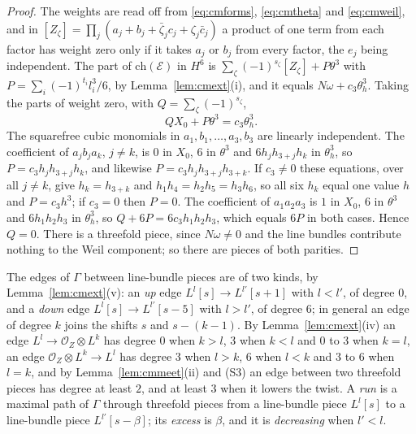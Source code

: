 \documentclass[11pt,reqno]{amsart}
\numberwithin{equation}{section}
\theoremstyle{plain}
\theoremstyle{definition}
\newcommand{\ch}{\mathrm{ch}}
\begin{document}
\begin{proof}
The weights are read off from \eqref{eq:cmforms}, \eqref{eq:cmtheta} and \eqref{eq:cmweil}, and in $[Z_{\zeta}]=\prod_{j}(a_{j}+b_{j}+\bar\zeta_{j}c_{j}+\zeta_{j}\bar c_{j})$ a product of one term from each factor has weight zero only if it takes $a_{j}$ or $b_{j}$ from every factor, the $e_{j}$ being independent. The part of $\ch(\mathcal{E})$ in $H^{6}$ is $\sum_{\zeta}(-1)^{s_{\zeta}}[Z_{\zeta}]+P\theta^{3}$ with $P=\sum_{i}(-1)^{t_{i}}l_{i}^{3}/6$, by Lemma~\ref{lem:cmext}(i), and it equals $N\omega+c_{3}\theta_{h}^{3}$. Taking the parts of weight zero, with $Q=\sum_{\zeta}(-1)^{s_{\zeta}}$,
\[
QX_{0}+P\theta^{3}=c_{3}\theta_{h}^{3}.
\]
The squarefree cubic monomials in $a_{1},b_{1},\dots,a_{3},b_{3}$ are linearly independent. The coefficient of $a_{j}b_{j}a_{k}$, $j\ne k$, is $0$ in $X_{0}$, $6$ in $\theta^{3}$ and $6h_{j}h_{3+j}h_{k}$ in $\theta_{h}^{3}$, so $P=c_{3}h_{j}h_{3+j}h_{k}$, and likewise $P=c_{3}h_{j}h_{3+j}h_{3+k}$. If $c_{3}\ne0$ these equations, over all $j\ne k$, give $h_{k}=h_{3+k}$ and $h_{1}h_{4}=h_{2}h_{5}=h_{3}h_{6}$, so all six $h_{k}$ equal one value $h$ and $P=c_{3}h^{3}$; if $c_{3}=0$ then $P=0$. The coefficient of $a_{1}a_{2}a_{3}$ is $1$ in $X_{0}$, $6$ in $\theta^{3}$ and $6h_{1}h_{2}h_{3}$ in $\theta_{h}^{3}$, so $Q+6P=6c_{3}h_{1}h_{2}h_{3}$, which equals $6P$ in both cases. Hence $Q=0$. There is a threefold piece, since $N\omega\ne0$ and the line bundles contribute nothing to the Weil component; so there are pieces of both parities.
\end{proof}

The edges of $\Gamma$ between line-bundle pieces are of two kinds, by Lemma~\ref{lem:cmext}(v): an \emph{up} edge $L^{l}[s]\to L^{l'}[s+1]$ with $l<l'$, of degree $0$, and a \emph{down} edge $L^{l}[s]\to L^{l'}[s-5]$ with $l>l'$, of degree $6$; in general an edge of degree $k$ joins the shifts $s$ and $s-(k-1)$. By Lemma~\ref{lem:cmext}(iv) an edge $L^{l}\to\mathcal{O}_{Z}\otimes L^{k}$ has degree $0$ when $k>l$, $3$ when $k<l$ and $0$ to $3$ when $k=l$, an edge $\mathcal{O}_{Z}\otimes L^{k}\to L^{l}$ has degree $3$ when $l>k$, $6$ when $l<k$ and $3$ to $6$ when $l=k$, and by Lemma~\ref{lem:cmmeet}(ii) and (S3) an edge between two threefold pieces has degree at least $2$, and at least $3$ when it lowers the twist. A \emph{run} is a maximal path of $\Gamma$ through threefold pieces from a line-bundle piece $L^{l}[s]$ to a line-bundle piece $L^{l'}[s-\beta]$; its \emph{excess} is $\beta$, and it is \emph{decreasing} when $l'<l$.
\end{document}

